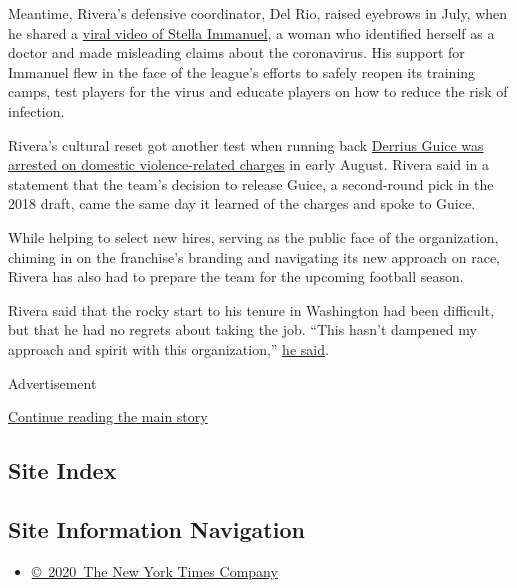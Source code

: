 Meantime, Rivera's defensive coordinator, Del Rio, raised eyebrows in
July, when he shared a
\href{https://www.nytimes3xbfgragh.onion/2020/07/28/technology/virus-video-trump.html}{viral
video of Stella Immanuel}, a woman who identified herself as a doctor
and made misleading claims about the coronavirus. His support for
Immanuel flew in the face of the league's efforts to safely reopen its
training camps, test players for the virus and educate players on how to
reduce the risk of infection.

Rivera's cultural reset got another test when running back
\href{https://www.washingtonpost.com/sports/2020/08/07/derrius-guice-arrested/}{Derrius
Guice was arrested on domestic violence-related charges} in early
August. Rivera said in a statement that the team's decision to release
Guice, a second-round pick in the 2018 draft, came the same day it
learned of the charges and spoke to Guice.

While helping to select new hires, serving as the public face of the
organization, chiming in on the franchise's branding and navigating its
new approach on race, Rivera has also had to prepare the team for the
upcoming football season.

Rivera said that the rocky start to his tenure in Washington had been
difficult, but that he had no regrets about taking the job. ``This
hasn't dampened my approach and spirit with this organization,''
\href{https://www.washingtonpost.com/sports/2020/07/28/washingtons-ron-rivera-says-nfl-season-can-still-happen-it-will-require-discipline/}{he
said}.

Advertisement

\protect\hyperlink{after-bottom}{Continue reading the main story}

\hypertarget{site-index}{%
\subsection{Site Index}\label{site-index}}

\hypertarget{site-information-navigation}{%
\subsection{Site Information
Navigation}\label{site-information-navigation}}

\begin{itemize}
\tightlist
\item
  \href{https://help.nytimes3xbfgragh.onion/hc/en-us/articles/115014792127-Copyright-notice}{©~2020~The
  New York Times Company}
\end{itemize}

